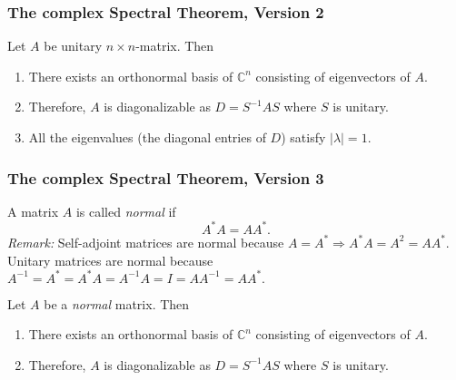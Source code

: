 \documentclass[11pt]{article}
\begin{document}
    \subsubsection{The complex Spectral Theorem, Version 2}

    Let $A$ be unitary \(n \times n\)-matrix. Then
    \begin{enumerate}
        \item There exists an orthonormal basis of \(\mathbb{C}^n\) consisting of eigenvectors of $A$.
        \item Therefore, $A$ is diagonalizable as \(D = S^{-1} AS\) where $S$ is unitary.
        \item All the eigenvalues (the diagonal entries of $D$) satisfy \(|\lambda | = 1\).
    \end{enumerate}

    \subsubsection{The complex Spectral Theorem, Version 3}

    A matrix $A$ is called \emph{normal} if \[A^* A = AA^*.\] \emph{Remark:} Self-adjoint matrices are normal because \(A = A^* \Rightarrow A^* A = A^2 = AA^*\). Unitary matrices are normal because \(A^{-1} = A^* = A^* A = A^{-1} A = I = AA^{-1} = AA^*.\)

    \vspace{1em}

    Let $A$ be a \emph{normal} matrix. Then
    \begin{enumerate}
        \item There exists an orthonormal basis of \(\mathbb{C}^n\) consisting of eigenvectors of $A$.
        \item Therefore, $A$ is diagonalizable as \(D = S^{-1} AS\) where $S$ is unitary.
    \end{enumerate}
\end{document}
